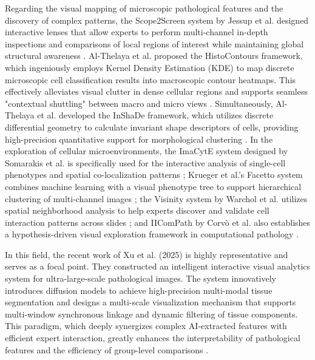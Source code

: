 \documentclass[journal]{vgtc}                     %
\begin{document}
Regarding the visual mapping of microscopic pathological features and the discovery of complex patterns, the Scope2Screen system by Jessup et al. designed interactive lenses that allow experts to perform multi-channel in-depth inspections and comparisons of local regions of interest while maintaining global structural awareness \cite{jessup2021scope2screen}. Al-Thelaya et al. proposed the HistoContours framework, which ingeniously employs Kernel Density Estimation (KDE) to map discrete microscopic cell classification results into macroscopic contour heatmaps. This effectively alleviates visual clutter in dense cellular regions and supports seamless "contextual shuttling" between macro and micro views \cite{al2021inshade}. Simultaneously, Al-Thelaya et al. developed the InShaDe framework, which utilizes discrete differential geometry to calculate invariant shape descriptors of cells, providing high-precision quantitative support for morphological clustering \cite{al2021inshade}. In the exploration of cellular microenvironments, the ImaCytE system designed by Somarakis et al. is specifically used for the interactive analysis of single-cell phenotypes and spatial co-localization patterns \cite{al2022histocontours}; Krueger et al.'s Facetto system combines machine learning with a visual phenotype tree to support hierarchical clustering of multi-channel images \cite{krueger2019facetto}; the Visinity system by Warchol et al. utilizes spatial neighborhood analysis to help experts discover and validate cell interaction patterns across slides \cite{warchol2022visinity}; and IIComPath by Corvò et al. also establishes a hypothesis-driven visual exploration framework in computational pathology \cite{corvo2020visual}.

In this field, the recent work of Xu et al. (2025) is highly representative and serves as a focal point. They constructed an intelligent interactive visual analytics system for ultra-large-scale pathological images. The system innovatively introduces diffusion models to achieve high-precision multi-modal tissue segmentation and designs a multi-scale visualization mechanism that supports multi-window synchronous linkage and dynamic filtering of tissue components. This paradigm, which deeply synergizes complex AI-extracted features with efficient expert interaction, greatly enhances the interpretability of pathological features and the efficiency of group-level comparisons \cite{xu2025intelligent}.

\end{document}
